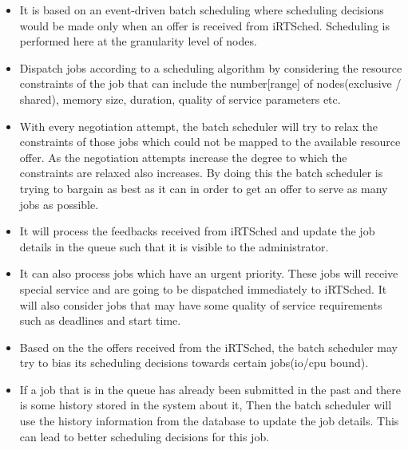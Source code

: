 \begin{itemize}
\item It is based on an event-driven batch scheduling where scheduling decisions would be made only when an offer is received from iRTSched. Scheduling is performed here at the granularity level of nodes.
\item Dispatch jobs according to a scheduling algorithm by considering the resource constraints of the job that can include the number[range] of nodes(exclusive / shared), memory size, duration, quality of service parameters etc.
\item With every negotiation attempt, the batch scheduler will try to relax the constraints of those jobs which could not be mapped to the available resource offer. As the negotiation attempts increase the degree to which the constraints are relaxed also increases. By doing this the batch scheduler is trying to bargain as best as it can in order to get an offer to serve as many jobs as possible.
\item It will process the feedbacks received from iRTSched and update the job details in the queue such that it is visible to the administrator.
\item It can also process jobs which have an urgent priority. These jobs will receive special service and are going to be dispatched immediately to iRTSched. It will also consider jobs that may have some quality of service requirements such as deadlines and start time.
\item Based on the the offers received from the iRTSched, the batch scheduler may try to bias its scheduling decisions towards certain jobs(io/cpu bound).
\item If a job that is in the queue has already been submitted in the past and there is some history stored in the system about it, Then the batch scheduler will use the history information from the database to update the job details. This can lead to better scheduling decisions for this job.
\end{itemize}
